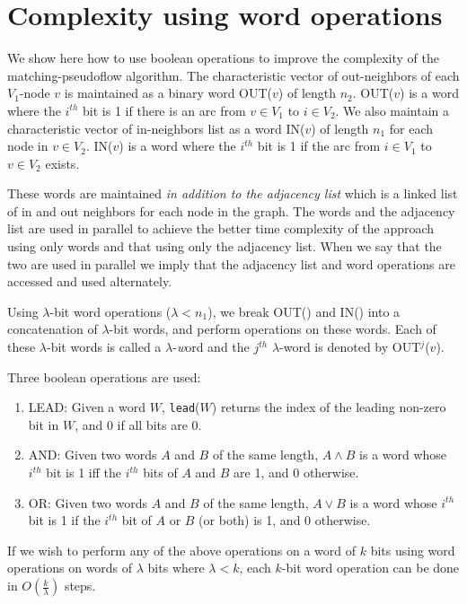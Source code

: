 \documentclass{article}
\begin{document}
\section{Complexity using word operations}
\label{sec:words}
We show here how to use boolean operations to improve the complexity of the {\sf matching-pseudoflow} algorithm. The characteristic vector of out-neighbors of each $V_1$-node $v$ is maintained as a binary word OUT($v$) of length $n_2$. OUT($v$) is a word where the $i^{th}$ bit is 1 if there is an arc from $v \in V_1$ to $i \in V_2$. We also maintain a characteristic vector of in-neighbors list as a word IN($v$) of length $n_1$ for each node in $v\in V_2$. IN($v$) is a word where the $i^{th}$ bit is 1 if the arc from $i \in V_1$ to $v \in V_2$ exists.

These words are maintained {\em in addition to the adjacency list} which is a linked list of in and out neighbors for each node in the graph. The words and the adjacency list are used in parallel to achieve the better time complexity of the approach using only words and that using only the adjacency list. When we say that the two are used in parallel we imply that the adjacency list and word operations are accessed and used alternately.

Using $\lambda$-bit word operations ($\lambda < n_1$), we break OUT() and IN() into a concatenation of $\lambda$-bit words, and perform operations on these words. Each of these $\lambda$-bit words is called a $\lambda$-{\emph word} and the $j^{th}$ $\lambda$-word is denoted by OUT$^{j}$($v$).

Three boolean operations are used:
\begin{enumerate}
\item LEAD:  Given a word $W$, {\tt lead}($W$) returns the index of the leading non-zero bit in $W$, and 0 if all bits are 0.
\item AND: Given two words $A$ and $B$ of the same length, $A \wedge B$ is a word whose $i^{th}$ bit is 1 iff the $i^{th}$ bits of $A$ and $B$ are 1, and 0 otherwise.
\item OR: Given two words $A$ and $B$ of the same length, $A \vee B$ is a word whose $i^{th}$ bit is 1 if the $i^{th}$ bit of $A$ or $B$ (or both) is 1, and 0 otherwise.
\end{enumerate}

If we wish to perform any of the above operations on a word of $k$ bits using word operations on words of $\lambda$ bits where $\lambda < k$, each $k$-bit word operation can be done in $O(\frac{k}{\lambda})$ steps.
\end{document}
